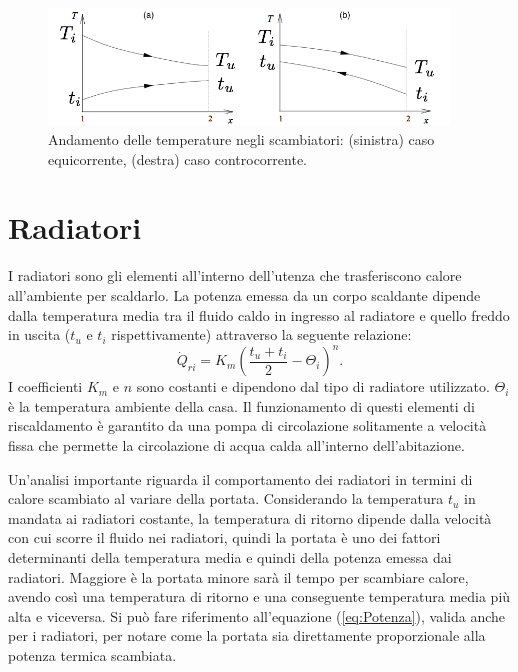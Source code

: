 \documentclass[laurea,oneside,11pt]{USiena_tesiLM3}
\begin{document}
\begin{figure}[h]
\begin{center}
\includegraphics[width=0.95\textwidth]{figure/grafico_scambiatore} %
\caption{Andamento delle temperature negli scambiatori: (sinistra) caso equicorrente, (destra) caso controcorrente.}
\label{fig:andamento}
\end{center}
\end{figure}

\section{Radiatori}
\label{subsec:radiatori}
I radiatori sono gli elementi all'interno dell'utenza che trasferiscono calore all'ambiente per scaldarlo. 
La potenza emessa da un corpo scaldante dipende dalla temperatura media tra il fluido caldo in ingresso al radiatore e quello freddo in uscita ($t_u$ e $t_i$ rispettivamente) attraverso la seguente relazione:
\begin{equation}
\dot{Q}_{ri}= K_m(\frac{t_u + t_i}{2} - \Theta_{i})^n .
\label{eq:potenza_radiatori}
\end{equation}
I coefficienti $K_m$ e $n$ sono costanti e dipendono dal tipo di radiatore utilizzato. $\Theta_i$ è la temperatura ambiente della casa. 
Il funzionamento di questi elementi di riscaldamento è garantito da una pompa di circolazione solitamente a velocità fissa che permette la circolazione di acqua calda all'interno dell'abitazione. 

Un'analisi importante riguarda il comportamento dei radiatori in termini di calore scambiato al variare della portata. Considerando la temperatura $t_u$ in mandata ai radiatori costante, la temperatura di ritorno dipende  dalla velocità con cui scorre il fluido nei radiatori, quindi la portata è uno dei fattori determinanti della temperatura media e quindi della potenza emessa dai radiatori. Maggiore è la portata minore sarà il tempo per scambiare calore, avendo così una temperatura di ritorno e una conseguente temperatura media più alta e viceversa. Si può fare riferimento all'equazione (\ref{eq:Potenza}), valida anche per i radiatori, per notare come la portata sia direttamente proporzionale alla potenza termica scambiata. 
\end{document}
